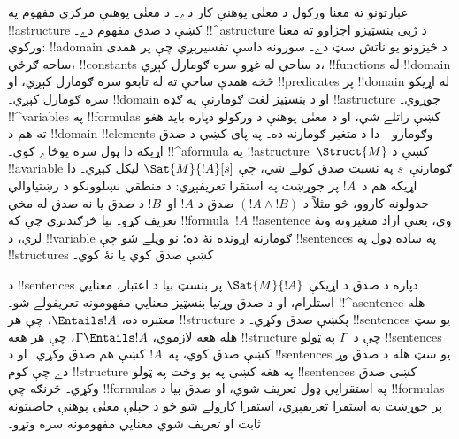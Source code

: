 \documentclass[../../../include/open-logic-section]{subfiles}
\begin{document}


عبارتونو ته معنا ورکول د معنٰی پوهنې کار دے۔ د معنٰی پوهنې مرکزي
مفهوم په !!a{structure} کښې د صدق مفهوم دے۔ !!^a{structure} د ژبې
بنسټيزو اجزاوو ته معنا ورکوي: !!a{domain} د څيزونو يو ناتش سټ دے۔
سورونه داسې تفسيرېږي چې پر همدې ساحه ګرځي، !!{constant}s د ساحې
له غړو سره ګومارل کېږي، !!{function}s له !!{domain} څخه
همدې ساحې ته له تابعو سره ګومارل کېږي، او !!{predicate}s پر
!!{domain} له اړيکو سره ګومارل کېږي۔ !!{domain} او د بنسټيز لغت
ګومارنې په ګډه !!a{structure} جوړوي۔ !!^{variable}s په !!{formula}s
کښې راتلے شي، او د معنٰی پوهنې د ورکولو دپاره بايد هغو ته هم د
!!{domain} !!{element}s وګومارو---دا د متغير ګومارنه ده۔ په پای کښې
د صدق اړيکه دا ټول سره يوځاے کوي۔ !!^a{formula} په
!!a{structure}~$\Struct{M}$ کښې د !!a{variable} ګومارنې~$s$ په نسبت
صدق کولے شي، چې $\Sat{M}{!A}[s]$ ليکل کېږي۔ دا اړيکه هم د~$!A$ پر
جوړښت په استقرا تعريفېږي: د منطقي نښلوونکو د رښتياوالي جدولونه
کاروو، څو مثلاً د $(!A \land !B)$ صدق د $!A$ او~$!B$ د صدق يا نه
صدق له مخې تعريف کړو۔ بيا څرګندېږي چې که !!{formula}~$!A$
!!a{sentence} وي، يعنې ازاد متغيرونه ونۀ لري، د !!{variable} ګومارنه
اړونده نۀ ده؛ نو ويلے شو چې !!{sentence}s په ساده ډول په
!!{structure}s کښې صدق کوي يا نۀ کوي۔

د !!{sentence}s دپاره د صدق د اړيکې $\Sat{M}{!A}$ پر بنسټ بيا د
اعتبار، معنايي استلزام، او د صدق وړتيا بنسټيز معنايي مفهومونه
تعريفولے شو۔ !!^a{sentence} هله معتبره ده، $\Entails !A$، چې هر
!!{structure} پکښې صدق وکړي۔ د !!{sentence}s يو سټ هله هغه لازموي،
$\Gamma \Entails !A$، چې هر هغه !!{structure} چې د~$\Gamma$ په ټولو
!!{sentence}s کښې صدق کوي، په~$!A$ کښې هم صدق وکړي۔ او د
!!{sentence}s يو سټ هله د صدق وړ دے چې کوم !!{structure} په هغه کښې
په يو وخت په ټولو !!{sentence}s کښې صدق وکړي۔ څرنګه چې !!{formula}s
په استقرايي ډول تعريف شوي، او صدق بيا د !!{formula}s پر جوړښت په
استقرا تعريفېږي، استقرا کارولے شو څو د خپلې معنٰی پوهنې خاصيتونه ثابت
او تعريف شوي معنايي مفهومونه سره وتړو۔
\end{document}

